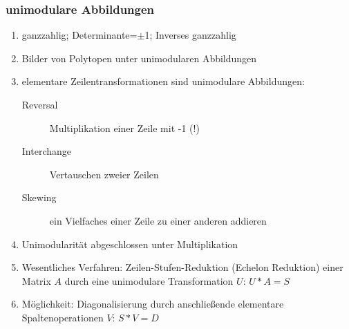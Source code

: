 \subsubsection{unimodulare Abbildungen}
\begin{enumerate}
	\item ganzzahlig; Determinante=$\pm$1; Inverses ganzzahlig
	\item Bilder von Polytopen unter unimodularen Abbildungen
	\item elementare Zeilentransformationen sind unimodulare Abbildungen:
		\begin{description}
			\item[Reversal] Multiplikation einer Zeile mit -1 (!)
			\item[Interchange] Vertauschen zweier Zeilen
			\item[Skewing] ein Vielfaches einer Zeile zu einer anderen addieren
		\end{description}
	\item Unimodularität abgeschlossen unter Multiplikation
	\item Wesentliches Verfahren: Zeilen-Stufen-Reduktion (Echelon Reduktion) einer Matrix $A$ durch eine unimodulare Transformation $U$: $U*A = S$
	\item Möglichkeit: Diagonalisierung durch anschließende elementare Spaltenoperationen $V$: $S*V = D$
\end{enumerate}


